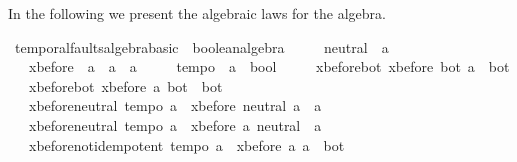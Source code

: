 %
\begin{isabellebody}%
%
%
\isamarkuptrue%
%
\begin{isamarkuptext}%
\label{sec:theory-algebra}%
\end{isamarkuptext}\isamarkuptrue%
%
\isadelimtheory
%
\endisadelimtheory
%
\isatagtheory
%
\endisatagtheory
{\isafoldtheory}%
%
\isadelimtheory
%
\endisadelimtheory
%
\begin{isamarkuptext}%
In the following we present the algebraic laws for the \ac{algebra}.%
\end{isamarkuptext}\isamarkuptrue%
%
\isamarkuptrue%
\isamarkupfalse%
\ temporal{\isacharunderscore}faults{\isacharunderscore}algebra{\isacharunderscore}basic\ {\isacharequal}\ boolean{\isacharunderscore}algebra\ \ {\isacharplus}\isanewline
\ \ \ neutral\ {\isacharcolon}{\isacharcolon}\ {\isachardoublequoteopen}{\isacharprime}a{\isachardoublequoteclose}\ \isanewline
\ \ \ xbefore\ {\isacharcolon}{\isacharcolon}\ {\isachardoublequoteopen}{\isacharprime}a\ {\isasymRightarrow}\ {\isacharprime}a\ {\isasymRightarrow}\ {\isacharprime}a{\isachardoublequoteclose}\ \ \isanewline
\ \ \ tempo{}\ {\isacharcolon}{\isacharcolon}\ {\isachardoublequoteopen}{\isacharprime}a\ {\isasymRightarrow}\ bool{\isachardoublequoteclose}\ \ \isanewline
\ \ \ xbefore{\isacharunderscore}bot{\isacharunderscore}{}{\isacharcolon}\ {\isachardoublequoteopen}xbefore\ bot\ a\ {\isacharequal}\ bot{\isachardoublequoteclose}\isanewline
\ \ \ xbefore{\isacharunderscore}bot{\isacharunderscore}{}{\isacharcolon}\ {\isachardoublequoteopen}xbefore\ a\ bot\ {\isacharequal}\ bot{\isachardoublequoteclose}\isanewline
\ \ \ xbefore{\isacharunderscore}neutral{\isacharunderscore}{}{\isacharcolon}\ {\isachardoublequoteopen}tempo{}\ a\ {\isasymLongrightarrow}\ xbefore\ neutral\ a\ {\isacharequal}\ a{\isachardoublequoteclose}\isanewline
\ \ \ xbefore{\isacharunderscore}neutral{\isacharunderscore}{}{\isacharcolon}\ {\isachardoublequoteopen}tempo{}\ a\ {\isasymLongrightarrow}\ xbefore\ a\ neutral\ {\isacharequal}\ a{\isachardoublequoteclose}\isanewline
\ \ \ xbefore{\isacharunderscore}not{\isacharunderscore}idempotent{\isacharcolon}\ {\isachardoublequoteopen}tempo{}\ a\ {\isasymLongrightarrow}\ xbefore\ a\ a\ {\isacharequal}\ bot{\isachardoublequoteclose}\isanewline

\end{isabellebody}
